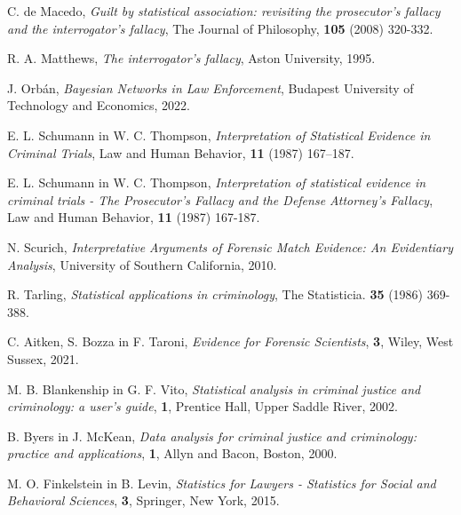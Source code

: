 \documentclass{beamer}
\begin{document}
\begin{frame}
    \begin{thebibliography}{99}
        C. de Macedo, \emph{Guilt by statistical association: revisiting the prosecutor’s fallacy and the interrogator’s fallacy}, The Journal of Philosophy, \textbf{105} (2008) 320-332.

        R. A. Matthews, \emph{The interrogator’s fallacy}, Aston University, 1995.

        J. Orbán, \emph{Bayesian Networks in Law Enforcement}, Budapest University of Technology and Economics, 2022.

        E. L. Schumann in W. C. Thompson, \emph{Interpretation of Statistical Evidence in Criminal Trials}, Law and Human Behavior, \textbf{11} (1987) 167–187.

        E. L. Schumann in W. C. Thompson, \emph{Interpretation of statistical evidence in criminal trials - The Prosecutor's Fallacy and the Defense Attorney's Fallacy}, Law and Human Behavior, \textbf{11} (1987) 167-187.

    \end{thebibliography}
\end{frame}

\begin{frame}
    \begin{thebibliography}{99}
        N. Scurich, \emph{Interpretative Arguments of Forensic Match Evidence: An Evidentiary Analysis}, University of Southern California, 2010.

        R. Tarling, \emph{Statistical applications in criminology}, The Statisticia. \textbf{35} (1986) 369-388.

        C. Aitken, S. Bozza in F. Taroni, \emph{Evidence for Forensic Scientists}, \textbf{3}, Wiley, West Sussex, 2021.

        M. B. Blankenship in G. F. Vito, \emph{Statistical analysis in criminal justice and criminology: a user's guide}, \textbf{1}, Prentice Hall, Upper Saddle River, 2002.

        B. Byers in J. McKean, \emph{Data analysis for criminal justice and criminology: practice and applications}, \textbf{1}, Allyn and Bacon, Boston, 2000.

        M. O. Finkelstein in B. Levin, \emph{Statistics for Lawyers - Statistics for Social and Behavioral Sciences}, \textbf{3}, Springer, New York, 2015.

    \end{thebibliography}
\end{frame}
\end{document}
